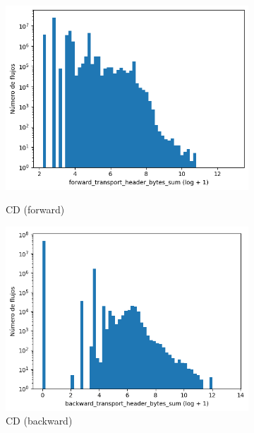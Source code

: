 \begin{figure}[H]
    \centering
    \begin{subfigure}[b]{0.26\textwidth}
        \centering
        \includegraphics[width=\textwidth]{media/packet_pincer_cicddos/forward_transport_header_bytes_sum_log_x_log_y.png}
        \caption{CD (forward)}
        \includegraphics[width=\textwidth]{media/packet_pincer_cicddos/backward_transport_header_bytes_sum_log_x_log_y.png}
        \caption{CD (backward)}
    \end{subfigure}
    \hfill
    \begin{subfigure}[b]{0.26\textwidth}
        \centering

\end{subfigure}
\end{figure}
